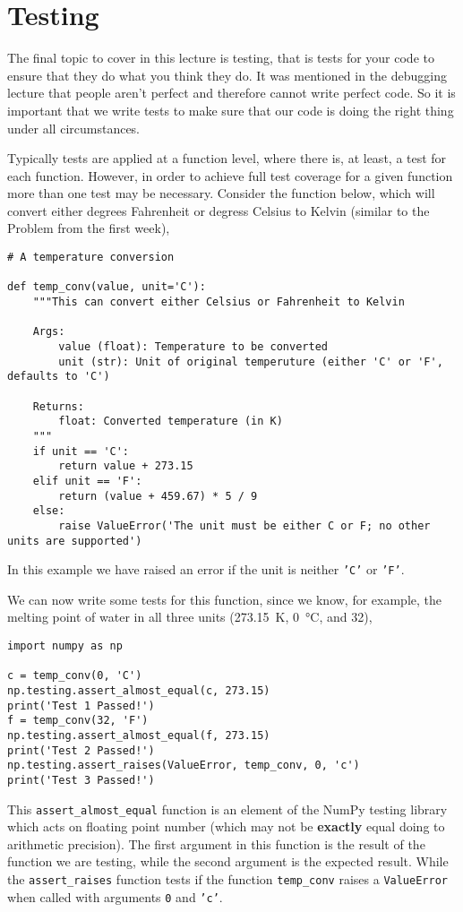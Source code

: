 \documentclass[a4paper]{article}
\begin{document}
\section{Testing}
The final topic to cover in this lecture is testing, that is tests for your code to ensure that they do what you think they do.
It was mentioned in the debugging lecture that people aren't perfect and therefore cannot write perfect code.
So it is important that we write tests to make sure that our code is doing the right thing under all circumstances.

Typically tests are applied at a function level, where there is, at least, a test for each function.
However, in order to achieve full test coverage for a given function more than one test may be necessary.
Consider the function below, which will convert either degrees Fahrenheit or degress Celsius to Kelvin (similar to the Problem from the first week),
\begin{lstlisting}
# A temperature conversion

def temp_conv(value, unit='C'):
    """This can convert either Celsius or Fahrenheit to Kelvin

    Args:
        value (float): Temperature to be converted
        unit (str): Unit of original temperuture (either 'C' or 'F', defaults to 'C')

    Returns:
        float: Converted temperature (in K)
    """
    if unit == 'C':
        return value + 273.15
    elif unit == 'F':
        return (value + 459.67) * 5 / 9
    else:
        raise ValueError('The unit must be either C or F; no other units are supported')
\end{lstlisting}
In this example we have raised an error if the unit is neither \texttt{'C'} or \texttt{'F'}.

We can now write some tests for this function, since we know, for example, the melting point of water in all three units (\SI{273.15}{\kelvin}, \SI{0}{\celsius}, and \SI{32}{\Fahrenheit}),
\begin{lstlisting}
import numpy as np

c = temp_conv(0, 'C')
np.testing.assert_almost_equal(c, 273.15)
print('Test 1 Passed!')
f = temp_conv(32, 'F')
np.testing.assert_almost_equal(f, 273.15)
print('Test 2 Passed!')
np.testing.assert_raises(ValueError, temp_conv, 0, 'c')
print('Test 3 Passed!')
\end{lstlisting}
This \texttt{assert\_almost\_equal} function is an element of the NumPy testing library which acts on floating point number (which may not be \textbf{exactly} equal doing to arithmetic precision).
The first argument in this function is the result of the function we are testing, while the second argument is the expected result.
While the \texttt{assert\_raises} function tests if the function \texttt{temp\_conv} raises a \texttt{ValueError} when called with arguments \texttt{0} and \texttt{'c'}.
\end{document}
